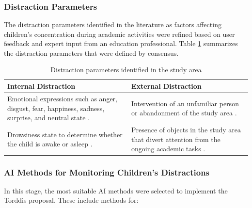                 \subsubsection{Distraction Parameters}
                The distraction parameters identified in the literature as factors affecting children's concentration during academic activities were refined based on user feedback and expert input from an education professional. Table \ref{tab:DistractionParameters} summarizes the distraction parameters that were defined by consensus.
                
                \begin{table}[!htbp]
                    \centering
                    \caption{Distraction parameters identified in the study area \label{tab:DistractionParameters}}
                    {\footnotesize
%
                        \begin{tabular}{
                                >{\raggedright\arraybackslash}p{}
                                >{\raggedright\arraybackslash}p{}
                            }
                            \toprule
                            \textbf{Internal Distraction} &
                            \textbf{External Distraction} \\
                            \midrule
                            
                            Emotional expressions such as anger, disgust, fear, happiness, sadness, surprise, and neutral state \citep{Asish2022Detecting,Vettivel2018System,Pabba2022AnIntelligent}. &
                            Intervention of an unfamiliar person or abandonment of the study area \citep{Vettivel2018System}. \\
                            
                            Drowsiness state to determine whether the child is awake or asleep \citep{Pabba2022AnIntelligent}. &
                            Presence of objects in the study area that divert attention from the ongoing academic tasks \citep{Asish2022Detecting,Pabba2022AnIntelligent}. \\
                            \bottomrule
                        \end{tabular}
                    }
                \end{table}
                
                \subsubsection{AI Methods for Monitoring Children's Distractions}
                In this stage, the most suitable AI methods were selected to implement the Torddis proposal. These include methods for:
                
